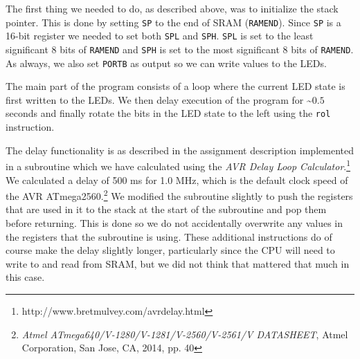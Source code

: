 The first thing we needed to do, as described above, was to initialize the stack pointer. This is done by setting \texttt{SP} to the end of SRAM (\texttt{RAMEND}). Since \texttt{SP} is a 16-bit register we needed to set both \texttt{SPL} and \texttt{SPH}. \texttt{SPL} is set to the least significant 8 bits of \texttt{RAMEND} and \texttt{SPH} is set to the most significant 8 bits of \texttt{RAMEND}. As always, we also set \texttt{PORTB} as output so we can write values to the LEDs.

The main part of the program consists of a loop where the current LED state is first written to the LEDs. We then delay execution of the program for \textasciitilde $0.5$ seconds and finally rotate the bits in the LED state to the left using the \texttt{rol} instruction. 

The delay functionality is as described in the assignment description implemented in a subroutine which we have calculated using the \emph{AVR Delay Loop Calculator}.\footnote{http://www.bretmulvey.com/avrdelay.html} We calculated a delay of 500 ms for 1.0 MHz, which is the default clock speed of the AVR ATmega2560.\footnote{\emph{Atmel ATmega640/V-1280/V-1281/V-2560/V-2561/V DATASHEET}, Atmel Corporation, San Jose, CA, 2014, pp. 40} We modified the subroutine slightly to push the registers that are used in it to the stack at the start of the subroutine and pop them before returning. This is done so we do not accidentally overwrite any values in the registers that the subroutine is using. These additional instructions do of course make the delay slightly longer, particularly since the CPU will need to write to and read from SRAM, but we did not think that mattered that much in this case.

